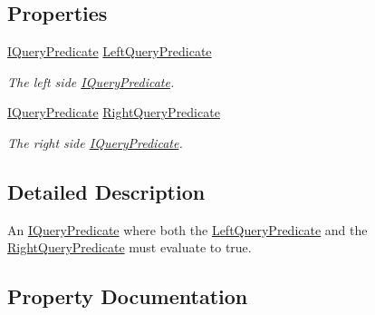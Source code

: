 \subsection*{Properties}
\begin{DoxyCompactItemize}
\item 
\hyperlink{interfaceCqrs_1_1Repositories_1_1Queries_1_1IQueryPredicate}{I\+Query\+Predicate} \hyperlink{classCqrs_1_1Repositories_1_1Queries_1_1AndQueryPredicate_ae083f7e251a564554bdb00b111226f18_ae083f7e251a564554bdb00b111226f18}{Left\+Query\+Predicate}
\begin{DoxyCompactList}\small\item\em The left side \hyperlink{interfaceCqrs_1_1Repositories_1_1Queries_1_1IQueryPredicate}{I\+Query\+Predicate}. \end{DoxyCompactList}\item 
\hyperlink{interfaceCqrs_1_1Repositories_1_1Queries_1_1IQueryPredicate}{I\+Query\+Predicate} \hyperlink{classCqrs_1_1Repositories_1_1Queries_1_1AndQueryPredicate_aa55816927e363ba4e7e313ad30ac2c2e_aa55816927e363ba4e7e313ad30ac2c2e}{Right\+Query\+Predicate}
\begin{DoxyCompactList}\small\item\em The right side \hyperlink{interfaceCqrs_1_1Repositories_1_1Queries_1_1IQueryPredicate}{I\+Query\+Predicate}. \end{DoxyCompactList}\end{DoxyCompactItemize}


\subsection{Detailed Description}
An \hyperlink{interfaceCqrs_1_1Repositories_1_1Queries_1_1IQueryPredicate}{I\+Query\+Predicate} where both the \hyperlink{classCqrs_1_1Repositories_1_1Queries_1_1AndQueryPredicate_ae083f7e251a564554bdb00b111226f18_ae083f7e251a564554bdb00b111226f18}{Left\+Query\+Predicate} and the \hyperlink{classCqrs_1_1Repositories_1_1Queries_1_1AndQueryPredicate_aa55816927e363ba4e7e313ad30ac2c2e_aa55816927e363ba4e7e313ad30ac2c2e}{Right\+Query\+Predicate} must evaluate to true. 



\subsection{Property Documentation}
\mbox{\label{classCqrs_1_1Repositories_1_1Queries_1_1AndQueryPredicate_ae083f7e251a564554bdb00b111226f18_ae083f7e251a564554bdb00b111226f18}} 
